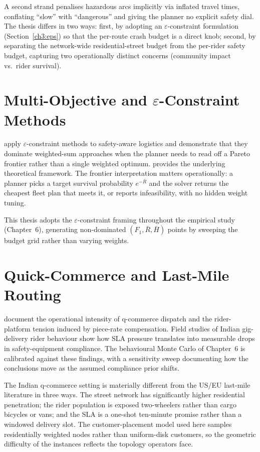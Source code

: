A second strand penalises hazardous arcs implicitly via inflated
travel times, conflating ``slow'' with ``dangerous'' and giving the
planner no explicit safety dial. The thesis differs in two ways:
first, by adopting an $\varepsilon$-constraint formulation
(Section~\ref{ch3:eps}) so that the per-route crash budget is a
direct knob; second, by separating the network-wide
residential-street budget from the per-rider safety budget, capturing
two operationally distinct concerns (community impact vs.\ rider
survival).

\section{Multi-Objective and \texorpdfstring{$\varepsilon$}{epsilon}-Constraint Methods}

\citet{salmon2023} apply $\varepsilon$-constraint methods to
safety-aware logistics and demonstrate that they dominate weighted-sum
approaches when the planner needs to read off a Pareto frontier
rather than a single weighted optimum. \citet{ehrgott2005} provides
the underlying theoretical framework. The frontier interpretation
matters operationally: a planner picks a target survival probability
$e^{-\bar{R}}$ and the solver returns the cheapest fleet plan that
meets it, or reports infeasibility, with no hidden weight tuning.

This thesis adopts the $\varepsilon$-constraint framing throughout
the empirical study (Chapter~6), generating non-dominated $(F_1,
\bar{R}, \bar{H})$ points by sweeping the budget grid rather than
varying weights.

\section{Quick-Commerce and Last-Mile Routing}

\citet{sinchaisri2023} document the operational intensity of
q-commerce dispatch and the rider-platform tension induced by
piece-rate compensation. Field studies of Indian gig-delivery rider
behaviour \citep{das2020,zografos2004} show how SLA pressure
translates into measurable drops in safety-equipment compliance. The
behavioural Monte Carlo of Chapter~6 is calibrated against these
findings, with a sensitivity sweep documenting how the conclusions
move as the assumed compliance prior shifts.

The Indian q-commerce setting is materially different from the
US/EU last-mile literature in three ways. The street network has
significantly higher residential penetration; the rider population is
exposed two-wheelers rather than cargo bicycles or vans; and the SLA
is a one-shot ten-minute promise rather than a windowed delivery
slot. The customer-placement model used here samples residentially
weighted nodes rather than uniform-disk customers, so the geometric
difficulty of the instances reflects the topology operators face.

